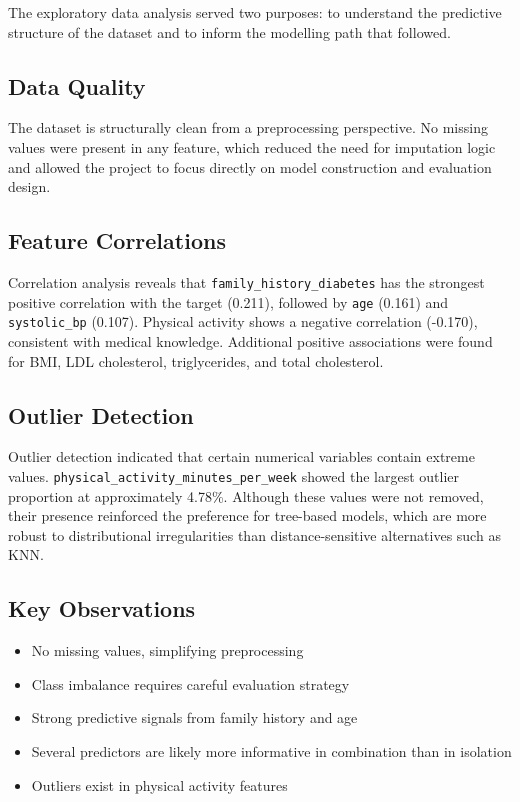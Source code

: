 \documentclass[a4paper,11pt]{article}
\begin{document}
The exploratory data analysis served two purposes: to understand the predictive structure of the dataset and to inform the modelling path that followed.

\subsection{Data Quality}
The dataset is structurally clean from a preprocessing perspective. No missing values were present in any feature, which reduced the need for imputation logic and allowed the project to focus directly on model construction and evaluation design.

\subsection{Feature Correlations}
Correlation analysis reveals that \texttt{family\_history\_diabetes} has the strongest positive correlation with the target (0.211), followed by \texttt{age} (0.161) and \texttt{systolic\_bp} (0.107). Physical activity shows a negative correlation (-0.170), consistent with medical knowledge. Additional positive associations were found for BMI, LDL cholesterol, triglycerides, and total cholesterol.

\subsection{Outlier Detection}
Outlier detection indicated that certain numerical variables contain extreme values. \texttt{physical\_activity\_minutes\_per\_week} showed the largest outlier proportion at approximately 4.78\%. Although these values were not removed, their presence reinforced the preference for tree-based models, which are more robust to distributional irregularities than distance-sensitive alternatives such as KNN.

\subsection{Key Observations}
\begin{itemize}
    \item No missing values, simplifying preprocessing
    \item Class imbalance requires careful evaluation strategy
    \item Strong predictive signals from family history and age
    \item Several predictors are likely more informative in combination than in isolation
    \item Outliers exist in physical activity features
\end{itemize}
\end{document}
